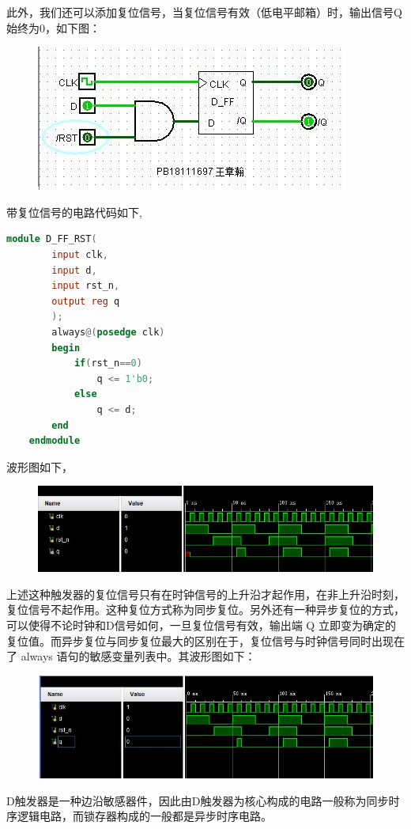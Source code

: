 \documentclass[UTF8]{article}
\begin{document}
	此外，我们还可以添加复位信号，当复位信号有效（低电平邮箱）时，输出信号Q始终为0，如下图：
	\begin{figure}[H]
		\centering
		\includegraphics[width=1\linewidth]{D_FF_RST.jpg}
		\label{D_FF_RST}
	\end{figure}
	带复位信号的电路代码如下,\par
	\begin{lstlisting}[language=Verilog]
	module D_FF_RST(
		input clk,
		input d,
		input rst_n,
		output reg q
		);
		always@(posedge clk)
		begin
			if(rst_n==0)
				q <= 1'b0;
			else
				q <= d;
		end
	endmodule
	\end{lstlisting}
	波形图如下，
	\begin{figure}[H]
		\centering
		\includegraphics[width=1\linewidth]{D_FF_RST_Oscillogram.jpg}
		\label{D_FF_RST_Oscillogram}
	\end{figure}
	上述这种触发器的复位信号只有在时钟信号的上升沿才起作用，在非上升沿时刻，复位信号不起作用。这种复位方式称为同步复位。另外还有一种异步复位的方式，可以使得不论时钟和D信号如何，一旦复位信号有效，输出端 Q 立即变为确定的复位值。而异步复位与同步复位最大的区别在于，复位信号与时钟信号同时出现在了 always 语句的敏感变量列表中。其波形图如下：
	
	\begin{figure}[H]
		\centering
		\includegraphics[width=1\linewidth]{D_FF_RST_Oscillogram_.jpg}
		\label{D_FF_RST_Oscillogram_}
	\end{figure}
	D触发器是一种边沿敏感器件，因此由D触发器为核心构成的电路一般称为同步时序逻辑电路，而锁存器构成的一般都是异步时序电路。\par
	
\end{document}
